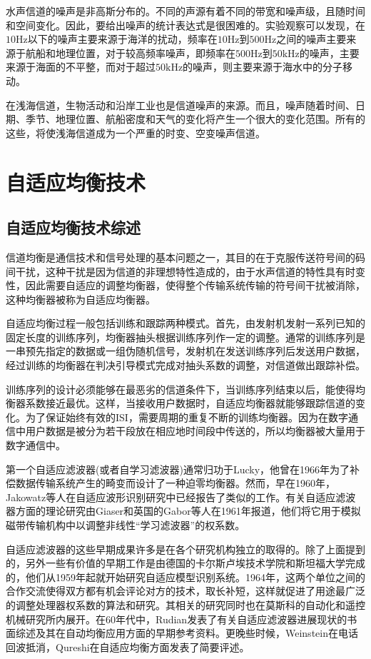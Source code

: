 水声信道的噪声是非高斯分布的。不同的声源有着不同的带宽和噪声级，且随时间和空间变化。因此，要给出噪声的统计表达式是很困难的。实验观察可以发现，在$10\mbox{Hz}$以下的噪声主要来源于海洋的扰动，频率在$10\mbox{Hz}$到$500\mbox{Hz}$之间的噪声主要来源于航船和地理位置，对于较高频率噪声，即频率在$500\mbox{Hz}$到$50\mbox{kHz}$的噪声，主要来源于海面的不平整，而对于超过$50\mbox{kHz}$的噪声，则主要来源于海水中的分子移动。

在浅海信道，生物活动和沿岸工业也是信道噪声的来源。而且，噪声随着时间、日期、季节、地理位置、航船密度和天气的变化将产生一个很大的变化范围。所有的这些，将使浅海信道成为一个严重的时变、空变噪声信道。
\section{自适应均衡技术}
\subsection{自适应均衡技术综述}
信道均衡是通信技术和信号处理的基本问题之一，其目的在于克服传送符号间的码间干扰，这种干扰是因为信道的非理想特性造成的，由于水声信道的特性具有时变性，因此需要自适应的调整均衡器，使得整个传输系统传输的符号间干扰被消除，这种均衡器被称为自适应均衡器。

自适应均衡过程一般包括训练和跟踪两种模式。首先，由发射机发射一系列已知的固定长度的训练序列，均衡器抽头根据训练序列作一定的调整。通常的训练序列是一串预先指定的数据或一组伪随机信号，发射机在发送训练序列后发送用户数据，经过训练的均衡器在判决引导模式完成对抽头系数的调整，对信道做出跟踪补偿。

训练序列的设计必须能够在最恶劣的信道条件下，当训练序列结束以后，能使得均衡器系数接近最优。这样，当接收用户数据时，自适应均衡器就能够跟踪信道的变化。为了保证始终有效的ISI，需要周期的重复不断的训练均衡器。因为在数字通信中用户数据是被分为若干段放在相应地时间段中传送的，所以均衡器被大量用于数字通信中。

第一个自适应滤波器(或者自学习滤波器)通常归功于Lucky，他曾在1966年为了补偿数据传输系统产生的畸变而设计了一种迫零均衡器。然而，早在1960年，Jakowatz等人在自适应波形识别研究中已经报告了类似的工作。有关自适应滤波器方面的理论研究由Giaser和英国的Gabor等人在1961年报道，他们将它用于模拟磁带传输机构中以调整非线性“学习滤波器”的权系数。

自适应滤波器的这些早期成果许多是在各个研究机构独立的取得的。除了上面提到的，另外一些有价值的早期工作是由德国的卡尔斯卢埃技术学院和斯坦福大学完成的，他们从1959年起就开始研究自适应模型识别系统。1964年，这两个单位之间的合作交流使得双方都有机会评论对方的技术，取长补短，这样就促进了用途最广泛的调整处理器权系数的算法和研究。其相关的研究同时也在莫斯科的自动化和遥控机械研究所内展开。在60年代中，Rudian发表了有关自适应滤波器进展现状的书面综述及其在自动均衡应用方面的早期参考资料。更晚些时候，Weinstein在电话回波抵消，Qureshi在自适应均衡方面发表了简要评述。

